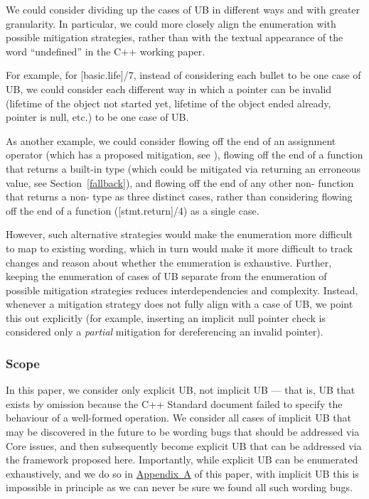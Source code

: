 We could consider dividing up the cases of UB in different ways and with greater granularity. In particular, we could more closely align the enumeration with possible mitigation strategies, rather than with the textual appearance of the word ``undefined'' in the C++ working paper.

For example, for [basic.life]/7, instead of considering each bullet to be one case of UB, we could consider each different way in which a pointer can be invalid (lifetime of the object not started yet, lifetime of the object ended already, pointer is null, etc.) to be one case of UB.

As another example, we could consider flowing off the end of an assignment operator (which has a proposed mitigation, see \cite{P2973R0}), flowing off the end of a function that returns a built-in type (which could be mitigated via returning an erroneous value, see Section~\ref{fallback}), and flowing off the end of any other non- function that returns a non- type as three distinct cases, rather than considering flowing off the end of a function ([stmt.return]/4) as a single case.

However, such alternative strategies would make the enumeration more difficult to map to existing wording, which in turn would make it more difficult to track changes and reason about whether the enumeration is exhaustive. Further, keeping the enumeration of cases of UB separate from the enumeration of possible mitigation strategies reduces interdependencies and complexity. Instead, whenever a mitigation strategy does not fully align with a case of UB, we point this out explicitly (for example, inserting an implicit null pointer check is considered only a \emph{partial} mitigation for dereferencing an invalid pointer).

\subsubsection{Scope}

In this paper, we consider only explicit UB, not implicit UB --- that is, UB that exists by omission because the C++ Standard document failed to specify the behaviour of a well-formed operation. We consider all cases of implicit UB that may be discovered in the future to be wording bugs that should be addressed via Core issues, and then subsequently become explicit UB that can be addressed  via the framework proposed here. Importantly, while explicit UB can be enumerated exhaustively, and we do so in \hyperref[appendix]{Appendix~A} of this paper, with implicit UB this is impossible in principle as we can never be sure we found all such wording bugs.

